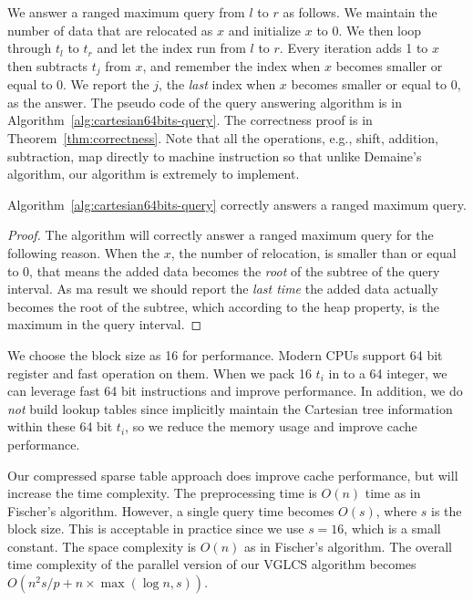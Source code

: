 

We answer a ranged maximum query from $l$ to $r$ as follows.  We
maintain the number of data that are relocated as $x$ and initialize
$x$ to 0.  We then loop through $t_l$ to $t_r$ and let the index run
from $l$ to $r$.  Every iteration adds 1 to $x$ then subtracts $t_j$
from $x$, and remember the index when $x$ becomes smaller or equal to
0.  We report the $j$, the {\em last} index when $x$ becomes smaller
or equal to 0, as the answer.  The pseudo code of the query answering
algorithm is in Algorithm~\ref{alg:cartesian64bits-query}.  The
correctness proof is in Theorem~\ref{thm:correctness}.  Note that all
the operations, e.g., shift, addition, subtraction, map directly to
machine instruction so that unlike Demaine's algorithm, our algorithm
is extremely to implement.





\begin{theorem} \label{thm:correctness}
  Algorithm~\ref{alg:cartesian64bits-query} correctly answers a ranged
  maximum query.
\end{theorem}
\begin{proof}
The algorithm will correctly answer a ranged maximum query for the
following reason.  When the $x$, the number of relocation, is smaller
than or equal to 0, that means the added data becomes the {\em root} of
the subtree of the query interval.  As ma result we should report the
{\em last time} the added data actually becomes the root of the
subtree, which according to the heap property, is the maximum in the
query interval.
\end{proof}

We choose the block size as 16 for performance.  Modern CPUs support
64 bit register and fast operation on them.  When we pack 16 $t_i$ in
to a 64 integer, we can leverage fast 64 bit instructions and improve
performance.  In addition, we do {\em not} build lookup tables since
implicitly maintain the Cartesian tree information within these 64
bit $t_i$, so we reduce the memory usage and improve cache
performance.

Our compressed sparse table approach does improve cache performance,
but will increase the time complexity.  The preprocessing time is
$O(n)$ time as in Fischer's algorithm.  However, a single query time
becomes $O(s)$, where $s$ is the block size.  This is acceptable in
practice since we use $s = 16$, which is a small constant.  The space
complexity is $O(n)$ as in Fischer's algorithm.  The overall time
complexity of the parallel version of our VGLCS algorithm becomes
$O(n^2 s / p + n \times \max(\log n, s))$.
